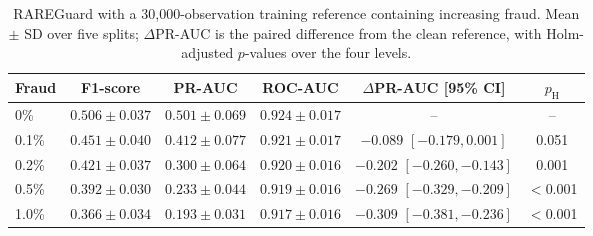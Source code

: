 \begin{table}[t]
\centering
\caption{RAREGuard with a 30{,}000-observation training reference containing increasing fraud. Mean $\pm$ SD over five splits; $\Delta$PR-AUC is the paired difference from the clean reference, with Holm-adjusted $p$-values over the four levels.}
\label{tab:contam}
\begin{tabular}{lccccc}
\toprule
Fraud & F1-score & PR-AUC & ROC-AUC & $\Delta$PR-AUC [95\% CI] & $p_{\mathrm{H}}$ \\
\midrule
0\% & $0.506\pm0.037$ & $0.501\pm0.069$ & $0.924\pm0.017$ & -- & -- \\
0.1\% & $0.451\pm0.040$ & $0.412\pm0.077$ & $0.921\pm0.017$ & $-0.089$ $[-0.179,0.001]$ & 0.051 \\
0.2\% & $0.421\pm0.037$ & $0.300\pm0.064$ & $0.920\pm0.016$ & $-0.202$ $[-0.260,-0.143]$ & 0.001 \\
0.5\% & $0.392\pm0.030$ & $0.233\pm0.044$ & $0.919\pm0.016$ & $-0.269$ $[-0.329,-0.209]$ & $<$0.001 \\
1.0\% & $0.366\pm0.034$ & $0.193\pm0.031$ & $0.917\pm0.016$ & $-0.309$ $[-0.381,-0.236]$ & $<$0.001 \\
\bottomrule
\end{tabular}
\end{table}
